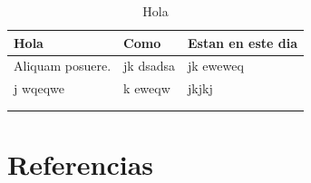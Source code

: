 \documentclass[11pt]{article}
\begin{document}
\begin{table}[htbp]
\centering
\begin{tabular}{|l|l|l|}
\hline
Hola & Como & Estan en este dia\\
\hline
Aliquam posuere. & jk dsadsa & jk eweweq\\
j wqeqwe & k eweqw & jkjkj\\
 &  & \\
 &  & \\
\hline
\end{tabular}
\caption{Hola}

\end{table}

\section{Referencias}
\label{sec:org34be946}
\printbibliography[heading=none]
\end{document}
